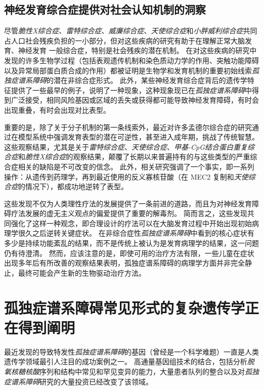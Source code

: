 \subsection{神经发育综合症提供对社会认知机制的洞察}

尽管\textit{脆性X综合症}、\textit{雷特综合症}、\textit{威廉综合症}、\textit{天使综合症}和\textit{小胖威利综合症}共同占人口社会残疾负担的一小部分，但对这些疾病的研究有助于在理解正常大脑发育、神经发育 一般综合症，特别是社会残疾的潜在机制。
在对这些疾病的研究中发现的许多生物学过程（包括表观遗传机制和染色质动力学的作用、突触功能障碍以及异常局部蛋白质合成的作用）都被证明是生物学和发育机制的重要初始线索\textit{孤独症谱系障碍}的潜在非综合症形式。
此外，某些神经发育综合症背后的遗传学特征提供了一些最早的例子，说明了一种现象，这种现象现已在\textit{孤独症谱系障碍}中得到广泛接受，相同风险基因或区域的丢失或获得都可能导致神经发育障碍，有时会出现重叠，有时会出现对比表型。


重要的是，除了关于分子机制的第一条线索外，最近对许多孟德尔综合症的研究通过在模型系统中强调发育表型的潜在可逆性，甚至进入成年期，挑战了传统智慧。
这些观察结果，尤其是关于\textit{雷特综合症}、\textit{天使综合症}、\textit{甲基-CpG结合蛋白重复综合症}和\textit{脆性X综合症}的观察结果，颠覆了长期以来普遍持有的与这些类型的严重综合症相关的缺陷是不可改变的信念。
此外，相关研究强调了一个事实，即一系列操作：从遗传到药理学，再到最近使用的反义寡核苷酸（在 MEC2 复制和\textit{天使综合症}的情况下），都成功地逆转了表型。


这些发现不仅为人类理性疗法的发展提供了一条前进的道路，而且为对神经发育障碍疗法发展的虚无主义观点的偏爱提供了重要的解毒剂。
简而言之，这些发现共同强化了这样一种观念，即合理设计的疗法可以在大脑发育过程中开始出现初始病理学很久之后逆转关键症状。
在非综合症性\textit{孤独症谱系障碍}中看到的核心症状有多少是持续功能紊乱的结果，而不是传统上被认为是发育病理学的结果，这一问题仍有待澄清。
然而，应该注意的是，即使可用的治疗方法有限，一些儿童在症状出现多年后有所改善的观察结果表明，孤独症谱系障碍的病理学方面并非完全静止，最终可能会产生新的生物驱动治疗方法。



\section{孤独症谱系障碍常见形式的复杂遗传学正在得到阐明}

最近发现的导致特发性\textit{孤独症谱系障碍}的基因（曾经是一个科学难题）一直是人类遗传学领域最引人注目的成功案例之一。
高通量基因组技术的结合，包括分析\textit{脱氧核糖核酸}序列和结构中常见和罕见变异的能力，大量患者队列的整合以及对\textit{孤独症谱系障碍}研究的大量投资已经改变了该领域。


